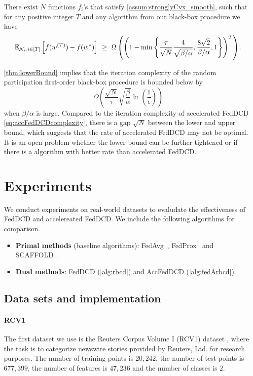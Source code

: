 \begin{theorem} \label{thm:lowerBound}
    There exist $N$ functions $f_i$'s that satisfy \autoref{assum:stronglyCvx_smooth}, such that for any positive integer $T$ and any algorithm from our black-box procedure we have
    \[\mathbb{E}_{ \mathcal{N}_i, i \in [T] } \left[ f( w^{(T)} ) - f(w^*) \right]  ~\geq~ \Omega \left( \left( 1 - \min\left\{ \frac{\tau}{\sqrt{N}} \frac{4}{ \sqrt{ \beta/\alpha }}, \frac{8 \sqrt{2} }{\beta/\alpha} , 1\right\} \right)^T \right).\]
\end{theorem}

\autoref{thm:lowerBound} implies that the iteration complexity of the random participation first-order black-box procedure is bounded below by
\[
    \Omega \left( \frac{\sqrt{N}}{\tau} \sqrt{ \frac{\beta}{\alpha} } \ln\left( \frac{1}{\epsilon} \right) \right)
\]
when $\beta/\alpha$ is large. Compared to the iteration complexity of accelerated FedDCD \eqref{eq:accFedDCDcomplexity}, there is a gap $\sqrt{N}$ between the lower and upper bound, which suggests that the rate of accelerated FedDCD may not be optimal. It is an open problem whether the lower bound can be further tightened or if there is a algorithm with better rate than accelerated FedDCD.


\section{Experiments}
\label{sec:experiments}

We conduct experiments on real-world datasets to evaludate the effectiveness of FedDCD and accelereated FedDCD. We include the following algorithms for comparison. 
\begin{itemize}
    \item \textbf{Primal methods} (baseline algorithms): FedAvg~\citep{mcmahan2017communication}, FedProx~\citep{li2018federated} and SCAFFOLD~\citep{pmlr-v119-karimireddy20a}. 
    \item \textbf{Dual methods}: FedDCD (\autoref{alg:rbcd}) and AccFedDCD (\autoref{alg:fedArbcd}).
\end{itemize}

\subsection{Data sets and implementation} \label{sec:details}
\paragraph{RCV1} The first dataset we use is the Reuters Corpus Volume I (RCV1) dataset \citep{lewis2004rcv1}, where the task is to categorize newswire
stories provided by Reuters, Ltd. for research purposes. The number of training points is $20,242$, the number of test points is $677,399$, the number of features is $47,236$ and the number of classes is $2$.

